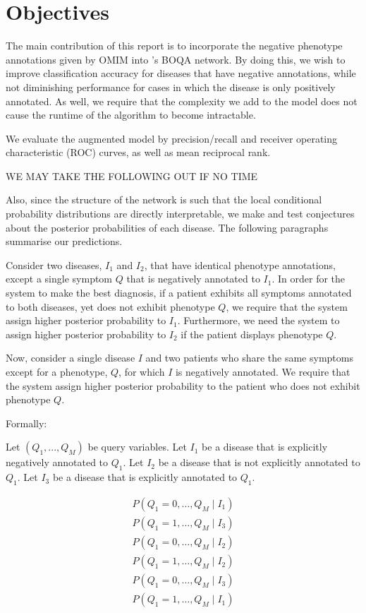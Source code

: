 \section{Objectives}
\label{sec:obj}

The main contribution of this report is to incorporate the negative phenotype
annotations given by OMIM \cite{hamosh2005online} into
\citeauthor{kohler2014hpo}'s BOQA network.
By doing this, we wish to improve classification accuracy for diseases that
have negative annotations, while not diminishing performance for cases in which
the disease is only positively annotated.
As well, we require that the complexity we add to the model does not cause the
runtime of the algorithm to become intractable.

We evaluate the augmented model by
precision/recall and receiver operating characteristic (ROC) curves,
as well as mean reciprocal rank.

WE MAY TAKE THE FOLLOWING OUT IF NO TIME

Also, since the structure of the network is such that the local conditional
probability distributions are directly interpretable, we make and test
conjectures about the posterior probabilities of each disease. 
The following paragraphs summarise our predictions.

Consider two diseases, $I_1$ and $I_2$, that have identical phenotype
annotations, except a single symptom $Q$ that is negatively annotated to $I_1$.
In order for the system to make the best diagnosis, if a patient exhibits all
symptoms annotated to both diseases, yet does not exhibit phenotype $Q$, we
require that the system assign higher posterior probability to $I_1$.
Furthermore, we need the system to assign higher posterior probability to $I_2$
if the patient displays phenotype $Q$.

Now, consider a single disease $I$ and two patients who share the same symptoms
except for a phenotype, $Q$, for which $I$ is negatively annotated. We require that
the system assign higher posterior probability to the patient who does not
exhibit phenotype $Q$.


Formally:

Let $(Q_1, ..., Q_M)$ be query variables.
Let $I_1$ be a disease that is explicitly negatively annotated to $Q_1$.
Let $I_2$ be a disease that is not explicitly annotated to $Q_1$.
Let $I_3$ be a disease that is explicitly annotated to $Q_1$.

\begin{align*}
    P(Q_1 = 0, \hdots, Q_M \mid I_1) \\
    P(Q_1 = 1, \hdots, Q_M \mid I_3) \\
    P(Q_1 = 0, \hdots, Q_M \mid I_2) \\
    P(Q_1 = 1, \hdots, Q_M \mid I_2) \\
    P(Q_1 = 0, \hdots, Q_M \mid I_3) \\
    P(Q_1 = 1, \hdots, Q_M \mid I_1) 
\end{align*}

